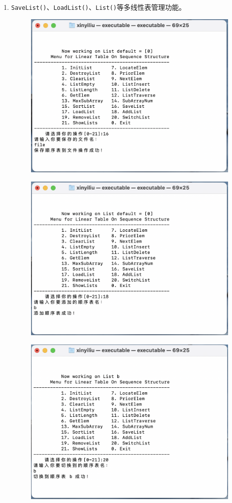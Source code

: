 \documentclass[supercite]{Experimental_Report}
\theoremstyle{definition}
\begin{document}
\begin{enumerate}
	\item \verb|SaveList()|、\verb|LoadList()|、\verb|List()|等多线性表管理功能。
	\begin{figure}[!htb]
		\includegraphics[width=0.8\linewidth]{images/截屏2023-06-01 22.19.25.png}
	\end{figure}
	\begin{figure}[!htb]
		\includegraphics[width=0.8\linewidth]{images/截屏2023-06-01 22.19.36.png}
	\end{figure}
	\begin{figure}[!htb]
		\includegraphics[width=0.8\linewidth]{images/截屏2023-06-01 22.19.46.png}

\end{figure}
\end{enumerate}
\end{document}
